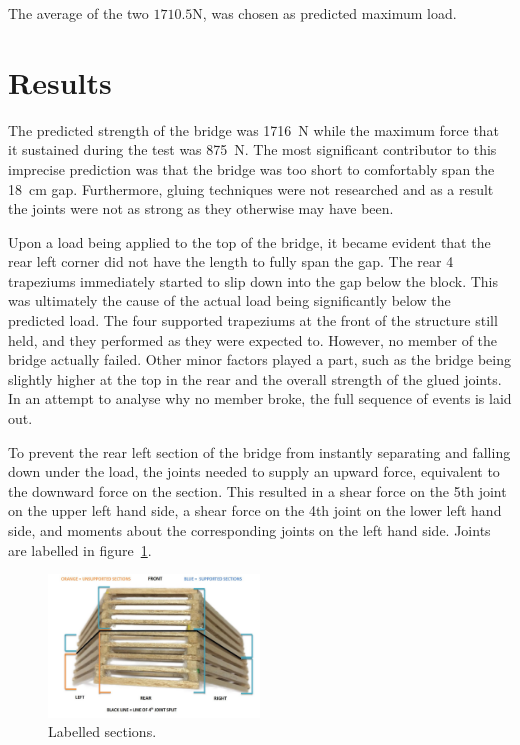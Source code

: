 \documentclass[12pt]{article}
\begin{document}
		The average of the two $1710.5\mathrm{N}$, was chosen as predicted maximum load.
	\section{Results}
The predicted strength of the bridge was 1716~N while the maximum force that it sustained during the test was 875~N. The most significant contributor to this imprecise prediction was that the bridge was too short to comfortably span the 18~cm gap. Furthermore, gluing techniques were not researched and as a result the joints were not as strong as they otherwise may have been.

Upon a load being applied to the top of the bridge, it became evident that the rear left corner did not have the length to fully span the gap. The rear 4 trapeziums immediately started to slip down into the gap below the block. This was ultimately the cause of the actual load being significantly below the predicted load. The four supported trapeziums at the front of the structure still held, and they performed as they were expected to. However, no member of the bridge actually failed. Other minor factors played a part, such as the bridge being slightly higher at the top in the rear and the overall strength of the glued joints. In an attempt to analyse why no member broke, the full sequence of events is laid out.

To prevent the rear left section of the bridge from instantly separating and falling down under the load, the joints needed to supply an upward force, equivalent to the downward force on the section. This resulted in a shear force on the 5th joint on the upper left hand side, a shear force on the 4th joint on the lower left hand side, and moments about the corresponding joints on the left hand side. Joints are labelled in figure~\ref{AnalysisLabelled}.
		   \begin{figure}[h!]
			\begin{center}
			\includegraphics[width=0.5\textwidth]{AnalysisLabelled}
			\end{center}
			\caption{Labelled sections.}
			\label{AnalysisLabelled}
		\end{figure}
             
\end{document}
